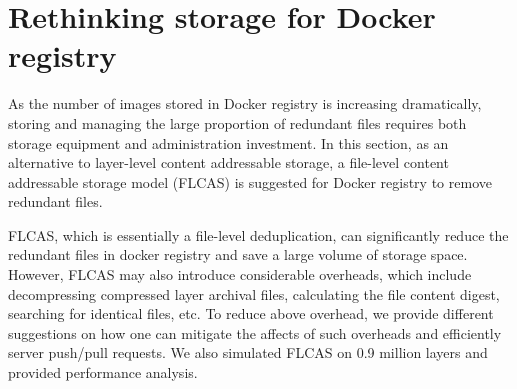\section{Rethinking storage for Docker registry}
\label{sec:file_adressable}
%
%
As the number of images stored in Docker registry is increasing dramatically,
storing and managing the large proportion of redundant files requires both
storage equipment and administration investment. 
%
In this section, as an
alternative to layer-level content addressable storage, a file-level content
addressable storage model (FLCAS) is suggested for Docker registry to remove
redundant files.%

FLCAS, which is essentially a file-level deduplication, can significantly
reduce the redundant files in docker registry and save a large volume of
storage space. 
%
However, FLCAS may also introduce considerable overheads, which
include decompressing compressed layer archival files, calculating the file
content digest, searching for identical files, etc.  
%
To reduce above overhead,
we provide different suggestions on how one can mitigate the affects of such
overheads and efficiently server push/pull requests. 
%
We also simulated FLCAS on
0.9 million layers and provided performance analysis.


